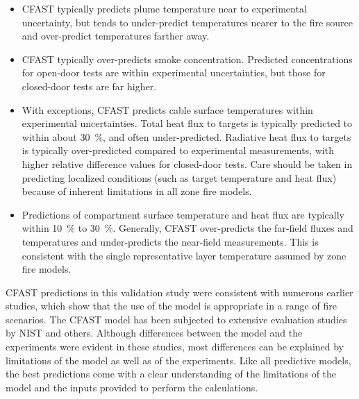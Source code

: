 \begin{itemize}
\item CFAST typically predicts plume temperature near to experimental uncertainty, but tends to under-predict temperatures nearer to the fire source and over-predict temperatures farther away.
\item CFAST typically over-predicts smoke concentration.  Predicted concentrations for open-door tests are within experimental uncertainties, but those for closed-door tests are far higher.
\item With exceptions, CFAST predicts cable surface temperatures within experimental uncertainties.  Total heat flux to targets is typically predicted to within about 30~\%, and often under-predicted.  Radiative heat flux to targets is typically over-predicted compared to experimental measurements, with higher relative difference values for closed-door tests.  Care should be taken in predicting localized conditions (such as target temperature and heat flux) because of inherent limitations in all zone fire models.
\item Predictions of compartment surface temperature and heat flux are typically within 10~\% to 30~\%.  Generally, CFAST over-predicts the far-field fluxes and temperatures and under-predicts the near-field measurements.  This is consistent with the single representative layer temperature assumed by zone fire models.
\end{itemize}

CFAST predictions in this validation study were consistent with numerous earlier studies, which show that the use of the model is appropriate in a range of fire scenarios.  The CFAST model has been subjected to extensive evaluation studies by NIST and others.  Although differences between the model and the experiments were evident in these studies, most differences can be explained by limitations of the model as well as of the experiments.  Like all predictive models, the best predictions come with a clear understanding of the limitations of the model and the inputs provided to perform the calculations.



